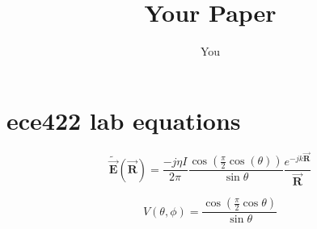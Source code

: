 \documentclass{article}
\title{Your Paper}
\author{You}
\begin{document}
\maketitle

\section*{ece422 lab equations}

\begin{equation}
    \tilde{\vec{\mathbf{E}}} (\vec{\mathbf{R}}) = \frac{-j \eta I}{2\pi} \frac{\cos (\frac{\pi}{2} \cos(\theta))}{\sin\theta} \frac{e^{-j k \vec{\mathbf{R}}}}{\vec{\mathbf{R}}}
\end{equation}


\begin{equation}
    V(\theta, \phi) = \frac{\cos (\frac{\pi}{2} \cos\theta)}{\sin\theta}
\end{equation}
\end{document}
